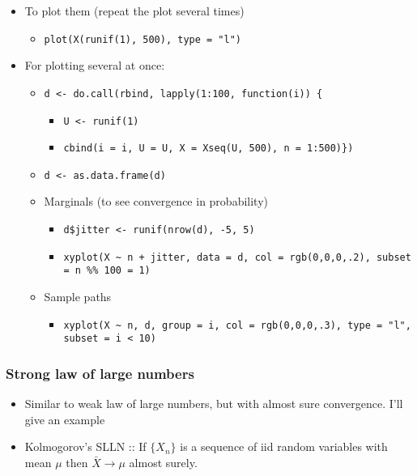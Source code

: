 \documentclass[11pt]{article}
\begin{document}
\begin{itemize}
\begin{itemize}
\begin{itemize}
\end{itemize}
\item To plot them (repeat the plot several times)
\begin{itemize}
\item \texttt{plot(X(runif(1), 500), type = "l")}
\end{itemize}
\item For plotting several at once:
\begin{itemize}
\item \texttt{d <- do.call(rbind, lapply(1:100, function(i)) \{}
\begin{itemize}
\item \texttt{U <- runif(1)}
\item \texttt{cbind(i = i, U = U, X = Xseq(U, 500), n = 1:500)\})}
\end{itemize}
\item \texttt{d <- as.data.frame(d)}
\item Marginals (to see convergence in probability)
\begin{itemize}
\item \texttt{d\$jitter <- runif(nrow(d), -5, 5)}
\item \texttt{xyplot(X \textasciitilde{} n + jitter, data = d, col = rgb(0,0,0,.2), subset = n \%\% 100 = 1)}
\end{itemize}
\item Sample paths
\begin{itemize}
\item \texttt{xyplot(X \textasciitilde{} n, d, group = i, col = rgb(0,0,0,.3), type = "l", subset = i < 10)}
\end{itemize}
\end{itemize}
\end{itemize}
\end{itemize}
\subsubsection{Strong law of large numbers}
\label{sec-1-5-3}

\begin{itemize}
\item Similar to weak law of large numbers, but with almost sure
       convergence.  I'll give an example
\item Kolmogorov's SLLN :: If $\{X_n\}$ is a sequence of iid random
          variables with mean $\mu$ then $\bar X \to \mu$ almost
          surely.
\end{itemize}
\end{document}
